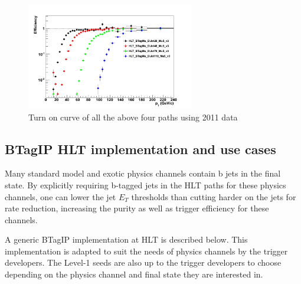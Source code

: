 \begin{figure}[h!]
\centering
\includegraphics[width=0.65\textwidth]{figures/BTagMuTriggerTurnOn.png}
\caption{Turn on curve of all the above four paths using 2011 data}
\label{fig:btagmuturnon}
\end{figure}


\subsection{BTagIP HLT implementation and use cases}
Many standard model and exotic physics channels contain b jets in the
final state. By explicitly requiring b-tagged jets in the HLT paths 
for these physics channels, one can lower the jet $E_T$ thresholds 
than cutting harder on the jets for rate reduction, increasing the
purity as well as trigger efficiency for these channels.

A generic BTagIP implementation at HLT is described below. This
implementation is adapted to suit the needs of physics channels by the 
trigger developers. The Level-1 seeds are also up to the trigger
developers to choose depending on the physics channel and final state
they are interested in.

